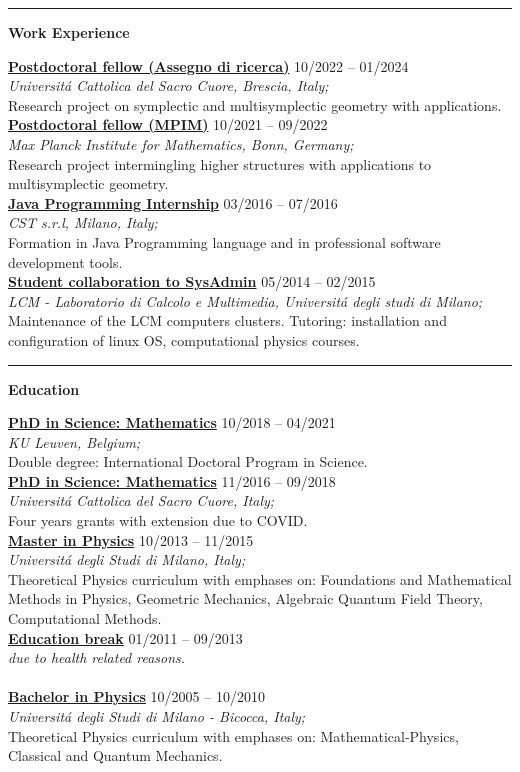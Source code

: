 \documentclass[a4paper]{article}
\newcommand{\block}[1]{\hrule \vspace{0.2cm} \textbf{\Large #1} \vspace{0.2cm}}
\newcommand{\voice}[5]{\href{#4}{\textbf{#1}} \hfill #2 \\ \textit{#3} \\ {\small #5} \vspace{0.2cm} \\}
\begin{document}

	\block{Work Experience}

	\voice{Postdoctoral fellow (Assegno di ricerca)}
		{10/2022 -- 01/2024}
		{Universit\'a Cattolica del Sacro Cuore, Brescia, Italy;}
		{https://dipartimenti.unicatt.it/dmf-home}       
		{Research project on symplectic and multisymplectic geometry with applications.}
	\voice{Postdoctoral fellow (MPIM)}
		{10/2021 -- 09/2022}
		{Max Planck Institute for Mathematics, Bonn, Germany;}
		{https://www.mpim-bonn.mpg.de/}       
		{Research project intermingling higher structures with applications to multisymplectic geometry.}
	\voice{Java Programming Internship}
		{03/2016 -- 07/2016}
		{CST s.r.l, Milano, Italy;}
		{https://www.csttech.it/}       
		{Formation in Java Programming language and in professional software development tools.}
	\voice{Student collaboration to SysAdmin}
		{05/2014 -- 02/2015}
		{LCM - Laboratorio di Calcolo e Multimedia, Universit\'a degli studi di Milano;}
		{https://lcm.mi.infn.it/}       
		{Maintenance of the LCM computers clusters. Tutoring: installation and configuration of linux OS, computational physics courses.\vspace{-0.25cm}}


	\block{Education}

	\voice{PhD in Science: Mathematics}
		{10/2018 -- 04/2021}
		{KU Leuven, Belgium;}
		{https://web.archive.org/save/http://scuoledidottorato.unicatt.it/phdschools/science-research-projects}       
		{Double degree: International Doctoral Program in Science.}
	\voice{PhD in Science: Mathematics}
		{11/2016 -- 09/2018}
		{Universit\'a Cattolica del Sacro Cuore, Italy;}
		{https://web.archive.org/save/http://scuoledidottorato.unicatt.it/phdschools/science-research-projects}       
		{Four years grants with extension due to COVID.}
	\voice{Master in Physics}
		{10/2013 -- 11/2015}
		{Universit\'a degli Studi di Milano, Italy;}
		{https://www.unimi.it/en/education/master-programme/physics-master-programme}       
		{Theoretical Physics curriculum with emphases on: Foundations and Mathematical Methods in Physics, Geometric Mechanics, Algebraic Quantum Field Theory, Computational Methods.}
	\voice{Education break}
		{01/2011 -- 09/2013}
		{due to health related reasons.}
		{}       
		{\vspace{-0.25cm}}
	\voice{Bachelor in Physics}
		{10/2005 -- 10/2010}
		{Universit\'a degli Studi di Milano - Bicocca, Italy;}
		{https://www.fisica.unimib.it/en/teaching/degree-courses/bachelor-three-year-laurea-physics}       
		{Theoretical Physics curriculum with emphases on: Mathematical-Physics, Classical and Quantum Mechanics.}
\end{document}
